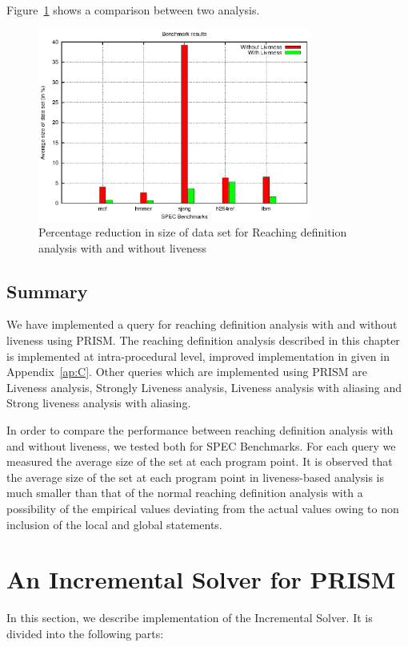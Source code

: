 \documentclass[11pt,a4paper,openright]{report}
\begin{document}
Figure~\ref{fig:bench_mark} shows a comparison between two analysis.
\begin{figure}[t]	
\centering
\includegraphics[width=0.8\textwidth]{graph.eps}
\caption{Percentage reduction in size of data set for Reaching definition analysis with and without liveness}
\label{fig:bench_mark}
\end{figure}


\section{Summary}
We have implemented a query for reaching definition analysis with and without liveness using PRISM.
The reaching definition analysis described in this chapter is implemented at intra-procedural level, improved implementation in given in Appendix~\ref{ap:C}.
Other queries which are implemented using PRISM are Liveness analysis, Strongly Liveness analysis, Liveness analysis with aliasing
and Strong liveness analysis with aliasing. 

In order to compare the performance between reaching definition analysis with and without liveness, we tested both for SPEC Benchmarks.
For each query we measured the average size of the set at each program point. It is observed that the average size of the set at each program 
point in liveness-based analysis is much smaller than that of the normal reaching definition analysis with a possibility of the empirical
values deviating from the actual values owing to non inclusion of the local and global statements.


\chapter{An Incremental Solver for PRISM}
In this section, we describe implementation of the Incremental Solver. It is divided into the following parts:
\end{document}
